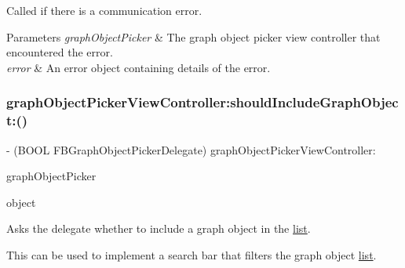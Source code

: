 Called if there is a communication error.


\begin{DoxyParams}{Parameters}
{\em graph\+Object\+Picker} & The graph object picker view controller that encountered the error. \\
\hline
{\em error} & An error object containing details of the error. \\
\hline
\end{DoxyParams}
\mbox{\label{protocolFBGraphObjectPickerDelegate_01-p_a52f34860c89cd1f02c6c4604bbf30629}} 
\subsubsection{\texorpdfstring{graph\+Object\+Picker\+View\+Controller\+:should\+Include\+Graph\+Object\+:()}{graphObjectPickerViewController:shouldIncludeGraphObject:()}\hspace{0.1cm}{\footnotesize\ttfamily [1/5]}}
{\footnotesize\ttfamily -\/ (B\+O\+OL F\+B\+Graph\+Object\+Picker\+Delegate) graph\+Object\+Picker\+View\+Controller\+: \begin{DoxyParamCaption}\item[{(\hyperlink{interfaceFBGraphObjectPickerViewController}{F\+B\+Graph\+Object\+Picker\+View\+Controller} $\ast$)}]{graph\+Object\+Picker }\item[{shouldIncludeGraphObject:(id$<$ \hyperlink{interfaceFBGraphObject}{F\+B\+Graph\+Object} $>$)}]{object }\end{DoxyParamCaption}\hspace{0.3cm}{\ttfamily [optional]}}

Asks the delegate whether to include a graph object in the \hyperlink{protocollist-p}{list}.

This can be used to implement a search bar that filters the graph object \hyperlink{protocollist-p}{list}.


